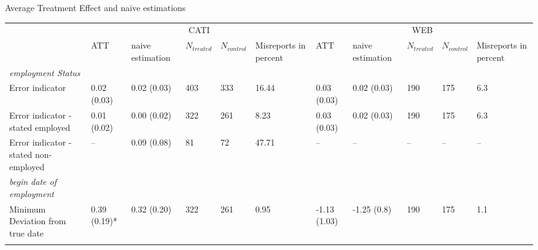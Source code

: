\begin{landscape}
\begin{threeparttable}
\caption{Average Treatment Effect and naive estimations}
\label{tab:tab_estimates}
\begin{tabular}{p{4.5cm}p{1.5cm}p{1.5cm}p{1cm}p{1cm}p{1.5cm}p{1.5cm}p{1.5cm}p{1cm}p{1cm}p{1.5cm}}
& \multicolumn{5}{c}{CATI} & \multicolumn{5}{c}{WEB}  \\ \addlinespace
\cmidrule(r{0.25em}){2-6} \cmidrule(l{0.25em}){7-11}
& ATT              & naive \newline estimation & \(N_{treated}\) & \(N_{control}\) & Misreports \newline in percent & ATT          & naive \newline estimation & \(N_{treated}\)  & \(N_{control}\) & Misreports \newline in percent \\ \addlinespace
\textit{employment Status}               &                  &                  &            &            &                       &              &                  &     &          &                       \\ \hline \addlinespace
Error indicator                     & 0.02 (0.03)       & 0.02 (0.03)      & 403        & 333        & 16.44                 & 0.03 (0.03)   & 0.02 (0.03)       & 190 & 175      & 6.3                   \\ \addlinespace
Error indicator - stated employed        & 0.01 (0.02)      & 0.00 (0.02)      & 322        & 261        & 8.23                  & 0.03 (0.03)  & 0.02 (0.03)       & 190 & 175      & 6.3                   \\ \addlinespace
Error indicator - stated non-employed    & --                & 0.09 (0.08)      & 81         & 72         & 47.71                 & --            & --                & --   & --        & --                     \\ \addlinespace
\textit{begin date of employment}        &                  &                  &            &            &                       &              &                  &     &          &                       \\ \hline \addlinespace
Minimum Deviation from true date         & 0.39 (0.19)*     & 0.32 (0.20)      & 322        & 261        & 0.95\tnote{a}                  & -1.13 (1.03) & -1.25 \newline (0.8)      & 190 & 175      & 1.1\tnote{a}                   \\ \addlinespace

\end{tabular}
\end{threeparttable}
\end{landscape}
